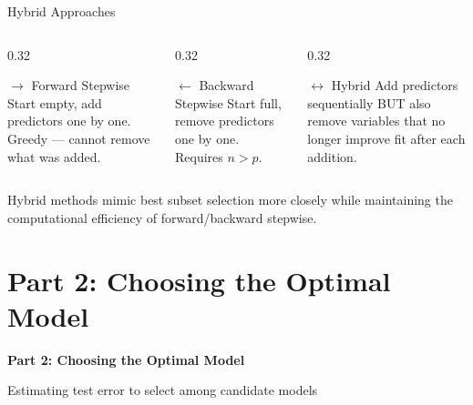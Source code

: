 \documentclass[ignorenonframetext,]{beamer}
\begin{document}
\begin{frame}{Hybrid Approaches}
\begin{columns}[T]
\begin{column}{0.32\textwidth}
\begin{block}{\small $\rightarrow$ Forward Stepwise}
\footnotesize
Start empty, add predictors one by one. Greedy --- cannot remove what was added.
\end{block}
\end{column}
\begin{column}{0.32\textwidth}
\begin{block}{\small $\leftarrow$ Backward Stepwise}
\footnotesize
Start full, remove predictors one by one. Requires $n > p$.
\end{block}
\end{column}
\begin{column}{0.32\textwidth}
\begin{exampleblock}{\small $\leftrightarrow$ Hybrid}
\footnotesize
Add predictors sequentially BUT also remove variables that no longer improve fit after each addition.
\end{exampleblock}
\end{column}
\end{columns}

\vspace{12pt}
\small
Hybrid methods mimic best subset selection more closely while maintaining the computational efficiency of forward/backward stepwise.
\end{frame}

\section{Part 2: Choosing the Optimal Model}

\begin{frame}
\centering
{\Large{}\textbf{Part 2: Choosing the Optimal Model}}

\vspace{12pt}
Estimating test error to select among candidate models
\end{frame}
\end{document}
